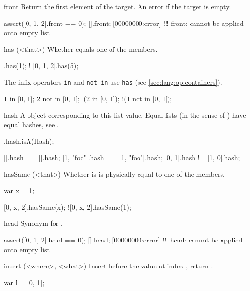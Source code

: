 \begin{urbiscriptapi}
\item[front]
  Return the first element of the target. An error if the target is
  empty.
\begin{urbiscript}
assert([0, 1, 2].front == 0);
[].front;
[00000000:error] !!! front: cannot be applied onto empty list
\end{urbiscript}


\item[has](<that>)%
  Whether \that equals one of the members.

\begin{urbiassert}
  [0, 1, 2].has(1);
! [0, 1, 2].has(5);
\end{urbiassert}

  The infix operators \lstinline|in| and \lstinline|not in| use
  \lstinline|has| (see \autoref{sec:lang:op:containers}).

\begin{urbiassert}
  1 in     [0, 1];
  2 not in [0, 1];
!(2 in     [0, 1]);
!(1 not in [0, 1]);
\end{urbiassert}


\item[hash] A  object corresponding to this list
  value. Equal lists (in the sense of ) have equal hashes, see
  .

\begin{urbiassert}
[].hash.isA(Hash);

        [].hash == [].hash;
[1, "foo"].hash == [1, "foo"].hash;
    [0, 1].hash != [1, 0].hash;
\end{urbiassert}


\item[hasSame](<that>)%
  Whether \that is is physically equal to one of the members.
\begin{urbiassert}
var x = 1;

 [0, x, 2].hasSame(x);
![0, x, 2].hasSame(1);
\end{urbiassert}


\item[head]
  Synonym for .
\begin{urbiscript}
assert([0, 1, 2].head == 0);
[].head;
[00000000:error] !!! head: cannot be applied onto empty list
\end{urbiscript}


\item[insert](<where>, <what>)%
  Insert  before the value at index , return
  \this.
\begin{urbiassert}
var l = [0, 1];


\end{urbiassert}
\end{urbiscriptapi}
